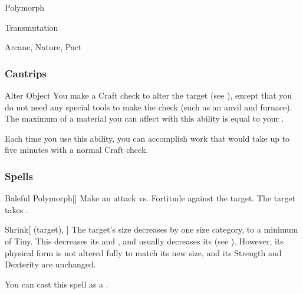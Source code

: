 \newpage
\begin{spellsection}{Polymorph}

\begin{spellheader}
\end{spellheader}


 Transmutation

 Arcane, Nature, Pact

\subsubsection{Cantrips}


\begin{freeability}{Alter Object}
You make a Craft check to alter the target (see ), except that you do not need any special tools to make the check (such as an anvil and furnace).
The maximum  of a material you can affect with this ability is equal to your .

Each time you use this ability, you can accomplish work that would take up to five minutes with a normal Craft check.
\end{freeability}

\end{spellsection}


\subsubsection{Spells}


\lowercase{\hypertarget{spell:Baleful Polymorph}{}}\label{spell:Baleful Polymorph}
\begin{freeability}[Rank 1]{\hypertarget{spell:Baleful Polymorph}{Baleful Polymorph}}[]
Make an attack vs. Fortitude against the target.
\hit The target takes .
\end{freeability}
\vspace{0.25em}



\lowercase{\hypertarget{spell:Shrink}{}}\label{spell:Shrink}
\begin{attuneability}[Rank 1]{\hypertarget{spell:Shrink}{Shrink}}[ (target), ]
The target's size decreases by one size category, to a minimum of Tiny.
This decreases its  and , and usually decreases its  (see ).
However, its physical form is not altered fully to match its new size, and its Strength and Dexterity are unchanged.

You can cast this spell as a .
\end{attuneability}
\vspace{0.25em}



